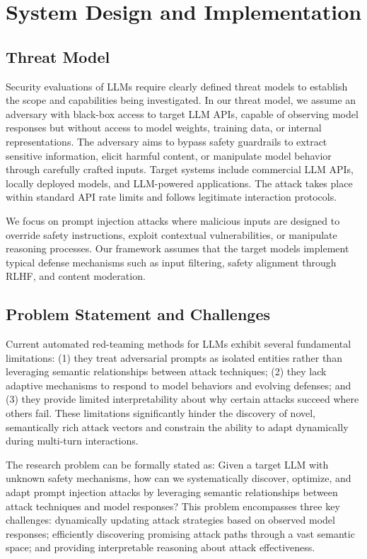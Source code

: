 \section{System Design and Implementation}

\subsection{Threat Model}
Security evaluations of LLMs require clearly defined threat models to establish the scope and capabilities being investigated. In our threat model, we assume an adversary with black-box access to target LLM APIs, capable of observing model responses but without access to model weights, training data, or internal representations. The adversary aims to bypass safety guardrails to extract sensitive information, elicit harmful content, or manipulate model behavior through carefully crafted inputs. Target systems include commercial LLM APIs, locally deployed models, and LLM-powered applications. The attack takes place within standard API rate limits and follows legitimate interaction protocols.

We focus on prompt injection attacks where malicious inputs are designed to override safety instructions, exploit contextual vulnerabilities, or manipulate reasoning processes. Our framework assumes that the target models implement typical defense mechanisms such as input filtering, safety alignment through RLHF, and content moderation.

\subsection{Problem Statement and Challenges}

Current automated red-teaming methods for LLMs exhibit several fundamental limitations: (1) they treat adversarial prompts as isolated entities rather than leveraging semantic relationships between attack techniques; (2) they lack adaptive mechanisms to respond to model behaviors and evolving defenses; and (3) they provide limited interpretability about why certain attacks succeed where others fail. These limitations significantly hinder the discovery of novel, semantically rich attack vectors and constrain the ability to adapt dynamically during multi-turn interactions.

The research problem can be formally stated as: Given a target LLM with unknown safety mechanisms, how can we systematically discover, optimize, and adapt prompt injection attacks by leveraging semantic relationships between attack techniques and model responses? This problem encompasses three key challenges: dynamically updating attack strategies based on observed model responses; efficiently discovering promising attack paths through a vast semantic space; and providing interpretable reasoning about attack effectiveness.

